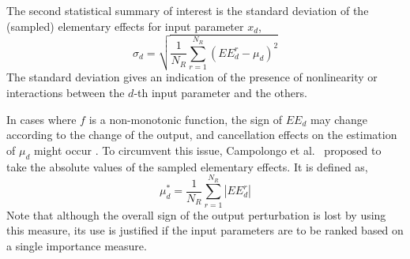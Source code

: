 The second statistical summary of interest is the standard deviation of the (sampled) elementary effects for input parameter $x_d$,
\begin{equation}
	\sigma_d = \sqrt{\frac{1}{N_R} \sum_{r = 1}^{N_R} (EE^r_d - \mu_d)^2}
	\label{eq:sa_morris_sd}
\end{equation} 
The standard deviation gives an indication of the presence of nonlinearity or interactions between the $d$-th input parameter and the others.

In cases where $f$ is a non-monotonic function,
the sign of $EE_d$ may change according to the change of the output,
and cancellation effects on the estimation of $\mu_d$ might occur .
To circumvent this issue,
Campolongo et al.~\cite{Campolongo2011} proposed to take the absolute values of the sampled elementary effects.
It is defined as,
\begin{equation}
	\mu^*_d = \frac{1}{N_R} \sum_{r = 1}^{N_R} |EE^r_d|
	\label{eq:sa_morris_mustar}
\end{equation}
Note that although the overall sign of the output perturbation is lost by using this measure,
its use is justified if the input parameters are to be ranked based on a single importance measure.


